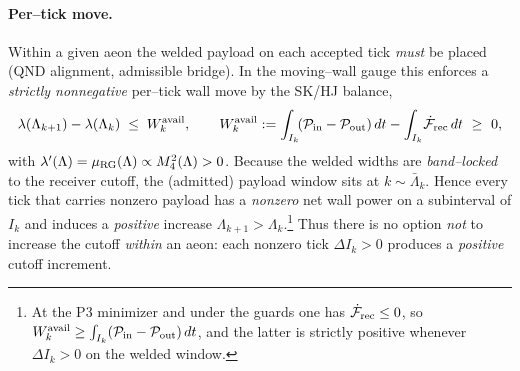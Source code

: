 \documentclass[10pt]{article}
\theoremstyle{definition}
\theoremstyle{plain}
\begin{document}
\paragraph{Per--tick move.}\label{par:uom-main-156}
Within a given aeon the welded payload on each accepted tick \emph{must} be placed (QND alignment, admissible bridge).
In the moving--wall gauge this enforces a \emph{strictly nonnegative} per--tick wall move by the SK/HJ balance,
\begin{equation}
\lambda(\Lambda_{k+1})-\lambda(\Lambda_k)
\;\le\; W^{\rm avail}_k,
\qquad
W^{\rm avail}_k
:=\int_{I_k}\!(\mathcal P_{\rm in}-\mathcal P_{\rm out})\,dt
-\int_{I_k}\!\dot{\mathcal F}_{\rm rec}\,dt\ \ge\ 0,
\label{eq:per-tick-move}
\end{equation}
with $\lambda'(\Lambda)=\mu_{\rm RG}(\Lambda)\propto M_4^2(\Lambda)>0$.
Because the welded widths are \emph{band--locked} to the receiver cutoff, the (admitted) payload window sits at $k\sim \bar\Lambda_k$.
Hence every tick that carries nonzero payload has a \emph{nonzero} net wall power on a subinterval of $I_k$ and induces a \emph{positive} increase $\Lambda_{k+1}>\Lambda_k$.\footnote{At the P3 minimizer and under the guards one has $\dot{\mathcal F}_{\rm rec}\le 0$, so $W^{\rm avail}_k\ge \int_{I_k}(\mathcal P_{\rm in}-\mathcal P_{\rm out})\,dt$, and the latter is strictly positive whenever $\Delta I_k>0$ on the welded window.}
Thus there is no option \emph{not} to increase the cutoff \emph{within} an aeon: each nonzero tick \(\Delta I_k>0\) produces a \emph{positive} cutoff increment.
\end{document}
